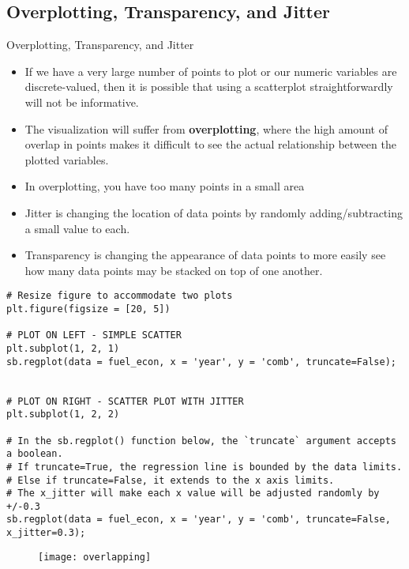 \documentclass[12pt]{beamer}
\begin{document}
\subsection{Overplotting, Transparency, and Jitter}
    \begin{frame}{Overplotting, Transparency, and Jitter}
    	\begin{itemize}
    		\item If we have a very large number of points to plot or our numeric variables are discrete-valued, then it is possible that using a scatterplot straightforwardly will not be informative. 
    		\item The visualization will suffer from \textbf{overplotting}, where the high amount of overlap in points makes it difficult to see the actual relationship between the plotted variables.
    		\item In overplotting, you have too many points in a small area
    		\item Jitter is changing the location of data points by randomly adding/subtracting a small value to each.
    		\item Transparency is changing the appearance of data points to more easily see how many data points may be stacked on top of one another.
    	\end{itemize}
    \end{frame}
    \begin{frame}[fragile]{}
    	\fontsize{8}{0}
    	\begin{verbatim}
# Resize figure to accommodate two plots
plt.figure(figsize = [20, 5])

# PLOT ON LEFT - SIMPLE SCATTER
plt.subplot(1, 2, 1)
sb.regplot(data = fuel_econ, x = 'year', y = 'comb', truncate=False);


# PLOT ON RIGHT - SCATTER PLOT WITH JITTER
plt.subplot(1, 2, 2)

# In the sb.regplot() function below, the `truncate` argument accepts a boolean.
# If truncate=True, the regression line is bounded by the data limits. 
# Else if truncate=False, it extends to the x axis limits.
# The x_jitter will make each x value will be adjusted randomly by +/-0.3
sb.regplot(data = fuel_econ, x = 'year', y = 'comb', truncate=False, x_jitter=0.3);
    	\end{verbatim}
    \begin{figure}
    	\centering
    	\texttt{[image: overlapping]}
    \end{figure}
    \end{frame}
\end{document}
